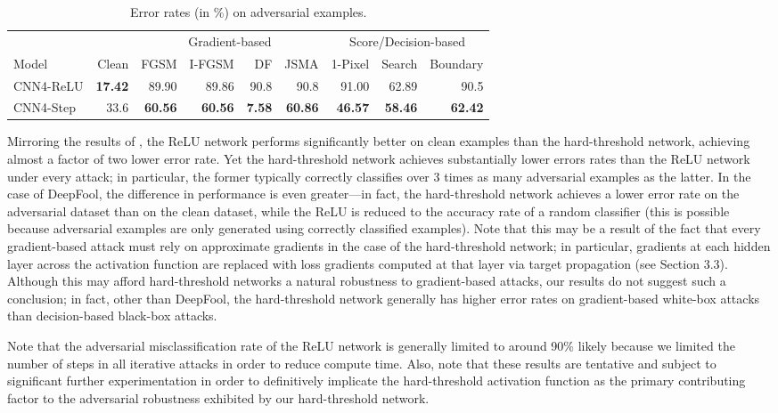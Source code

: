 \renewcommand{\arraystretch}{1.2}
\begin{table}[H]
\centering
\caption{Error rates (in \%) on adversarial examples.}
\begin{tabular}{@{}lrrrrrrrr@{}}
 & & \multicolumn{4}{c}{Gradient-based} & \multicolumn{3}{c}{Score/Decision-based}  \\ 
\cmidrule{3-6} \cmidrule{7-9}
Model & Clean & FGSM & I-FGSM & DF & JSMA & 1-Pixel & Search & Boundary  \\ \hline
CNN4-ReLU & \textbf{17.42} & 89.90 & 89.86 & 90.8 & 90.8 & 91.00 & 62.89 & 90.5  \\ \hline
CNN4-Step & 33.6 & \textbf{60.56} & \textbf{60.56} & \textbf{7.58} & \textbf{60.86} & \textbf{46.57} & \textbf{58.46} & \textbf{62.42}  \\
\bottomrule
\end{tabular}
\end{table}

Mirroring the results of \cite{friesen2017deep}, the ReLU network performs significantly better on clean examples than the hard-threshold network, achieving almost a factor of two lower error rate. Yet the hard-threshold network achieves substantially lower errors rates than the ReLU network under every attack; in particular, the former typically correctly classifies over 3 times as many adversarial examples as the latter. In the case of DeepFool, the difference in performance is even greater---in fact, the hard-threshold network achieves a lower error rate on the adversarial dataset than on the clean dataset, while the ReLU is reduced to the accuracy rate of a random classifier (this is possible because adversarial examples are only generated using correctly classified examples). Note that this may be a result of the fact that every gradient-based attack must rely on approximate gradients in the case of the hard-threshold network; in particular, gradients at each hidden layer across the activation function are replaced with loss gradients computed at that layer via target propagation (see Section 3.3). Although this may afford hard-threshold networks a natural robustness to gradient-based attacks, our results do not suggest such a conclusion; in fact, other than DeepFool, the hard-threshold network generally has higher error rates on gradient-based white-box attacks than decision-based black-box attacks. 

Note that the adversarial misclassification rate of the ReLU network is generally limited to around 90\% likely because we limited the number of steps in all iterative attacks in order to reduce compute time. Also, note that these results are tentative and subject to significant further experimentation in order to definitively implicate the hard-threshold activation function as the primary contributing factor to the adversarial robustness exhibited by our hard-threshold network.


